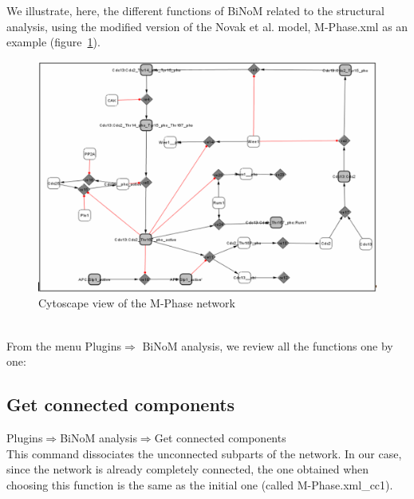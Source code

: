 We illustrate, here, the different functions of BiNoM related to the structural analysis, using the modified version of the Novak et al. model, M-Phase.xml as an example (figure~\ref{Cytoscape_view_of_the_M-Phase_network}).
\begin{figure}
\centering
\includegraphics[width=14 cm]{graphics/Cytoscape_view_of_the_M-Phase_network.png}
\caption{Cytoscape view of the M-Phase network}
\label{Cytoscape_view_of_the_M-Phase_network}
\end{figure}
\\From the menu Plugins$\Rightarrow$ BiNoM analysis, we review all the functions one by one:
\subsection{Get connected components}
Plugins$\Rightarrow$BiNoM analysis$\Rightarrow$Get connected components\\
This command dissociates the unconnected subparts of the network. In our case, since the network is already completely connected, the one obtained when choosing this function is the same as the initial one (called M-Phase.xml\_cc1).
